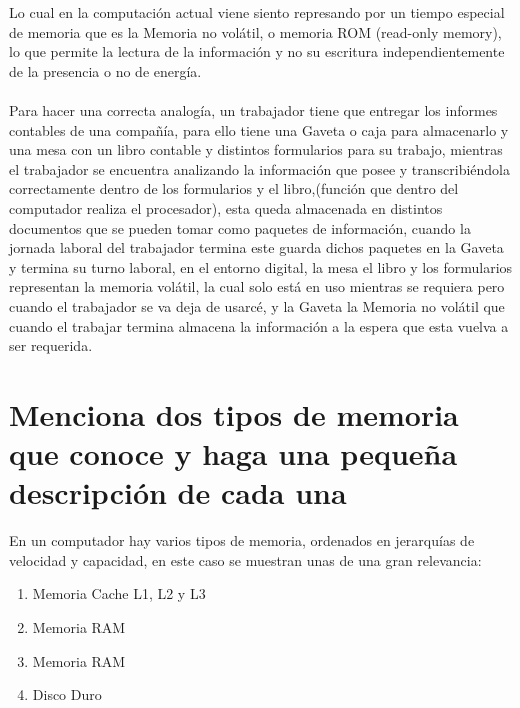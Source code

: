 \documentclass{article}
\begin{document}
	 Lo cual en la computación actual viene siento represando por un tiempo especial de memoria que es la Memoria no volátil, o memoria ROM (read-only memory), lo que permite la lectura de la información y no su escritura independientemente de la presencia o no de energía.
	 \\\\
	 Para hacer una correcta analogía, un trabajador tiene que entregar los informes contables de una compañía, para ello tiene una Gaveta o caja para almacenarlo y una mesa con un libro contable y distintos formularios para su trabajo, mientras el trabajador se encuentra analizando la información que posee y transcribiéndola correctamente dentro de los formularios y el libro,(función que dentro del computador realiza el procesador), esta queda almacenada en distintos documentos que se pueden tomar como paquetes de información, cuando la jornada laboral del trabajador termina este guarda dichos paquetes en la Gaveta y termina su turno laboral, en el entorno digital, la mesa el libro y los formularios representan la memoria volátil, la cual solo está en uso mientras se requiera pero cuando el trabajador se va deja de usarcé, y la Gaveta la Memoria no volátil que cuando el trabajar termina almacena la información a la espera que esta vuelva a ser requerida.
	
	\section{Menciona dos tipos de memoria que conoce y haga una pequeña descripción de cada una} \label{menciona}
	En un computador hay varios tipos de memoria, ordenados en jerarquías de velocidad y
capacidad, en este caso se muestran unas de una gran relevancia:
	
	\begin{enumerate}
		
		\item Memoria Cache L1, L2 y L3
		\item Memoria RAM
		\item Memoria RAM
		\item Disco Duro
		
	\end{enumerate}
	
\end{document}
